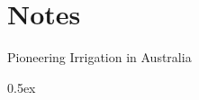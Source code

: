 
\chapter{Notes}
\label{ch:notes}
%
{Pioneering Irrigation in Australia}

\begingroup
\parindent 0pt
\parskip   0.5ex
\renewcommand{\enotesize}{\normalsize}
\theendnotes
\endgroup
